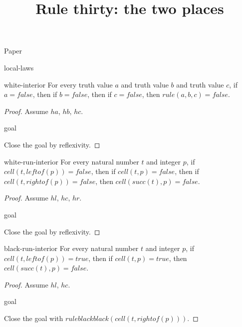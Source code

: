 \begin{lexlean}{Paper}
\title{Rule thirty: the two places}

\begin{section}{local-laws}
  \begin{lemma}{white-interior}
  \noaxioms
  For every truth value \(a\) and truth value \(b\) and truth value \(c\), if \(a = false\), then if \(b = false\), then if \(c = false\), then \(rule(a, b, c) = false\).
  \begin{proof}
  Assume \(ha\), \(hb\), \(hc\).
  \begin{rewrite}{goal}
  \end{rewrite}
  Close the goal by reflexivity.
  \end{proof}
  \end{lemma}

  \begin{lemma}{white-run-interior}
  For every natural number \(t\) and integer \(p\), if \(cell(t, leftof(p)) = false\), then if \(cell(t, p) = false\), then if \(cell(t, rightof(p)) = false\), then \(cell(succ(t), p) = false\).
  \begin{proof}
  Assume \(hl\), \(hc\), \(hr\).
  \begin{rewrite}{goal}
  \end{rewrite}
  Close the goal by reflexivity.
  \end{proof}
  \end{lemma}

  \begin{lemma}{black-run-interior}
  For every natural number \(t\) and integer \(p\), if \(cell(t, leftof(p)) = true\), then if \(cell(t, p) = true\), then \(cell(succ(t), p) = false\).
  \begin{proof}
  Assume \(hl\), \(hc\).
  \begin{rewrite}{goal}
  \end{rewrite}
  Close the goal with \(ruleblackblack(cell(t, rightof(p)))\).
  \end{proof}
  \end{lemma}


\end{section}
\end{lexlean}
